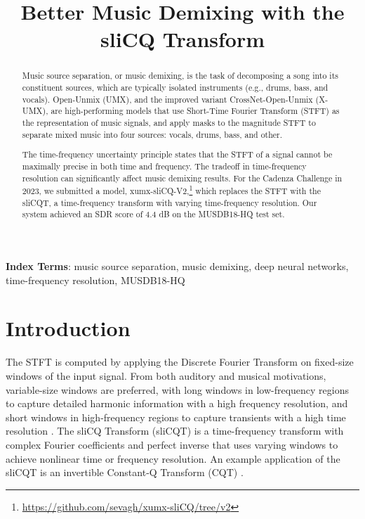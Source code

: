 \documentclass{INTERSPEECH2023}
\title{Better Music Demixing with the sliCQ Transform}
\begin{document}
\maketitle
 
\begin{abstract}
Music source separation, or music demixing, is the task of decomposing a song into its constituent sources, which are typically isolated instruments (e.g., drums, bass, and vocals). Open-Unmix (UMX), and the improved variant CrossNet-Open-Unmix (X-UMX), are high-performing models that use Short-Time Fourier Transform (STFT) as the representation of music signals, and apply masks to the magnitude STFT to separate mixed music into four sources: vocals, drums, bass, and other.

        The time-frequency uncertainty principle states that the STFT of a signal cannot be maximally precise in both time and frequency. The tradeoff in time-frequency resolution can significantly affect music demixing results. For the Cadenza Challenge in 2023, we submitted a model, xumx-sliCQ-V2,\footnote{\url{https://github.com/sevagh/xumx-sliCQ/tree/v2}} which replaces the STFT with the sliCQT, a time-frequency transform with varying time-frequency resolution. Our system achieved an SDR score of 4.4 dB on the MUSDB18-HQ test set. 
\end{abstract}
\noindent\textbf{Index Terms}: music source separation, music demixing, deep neural networks, time-frequency resolution, MUSDB18-HQ

\section{Introduction}

The STFT is computed by applying the Discrete Fourier Transform on fixed-size windows of the input signal. From both auditory and musical motivations, variable-size windows are preferred, with long windows in low-frequency regions to capture detailed harmonic information with a high frequency resolution, and short windows in high-frequency regions to capture transients with a high time resolution \cite{doerflerphd}. The sliCQ Transform (sliCQT) \cite{slicq} is a time-frequency transform with complex Fourier coefficients and perfect inverse that uses varying windows to achieve nonlinear time or frequency resolution. An example application of the sliCQT is an invertible Constant-Q Transform (CQT) \cite{jbrown}.
\end{document}
